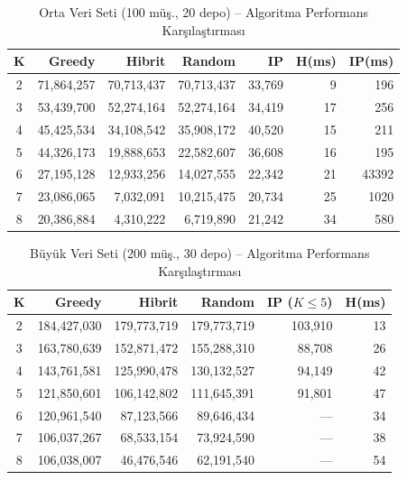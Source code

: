\documentclass[conference]{IEEEtran}
\begin{document}
\begin{table}[htbp]
\centering
\caption{Orta Veri Seti (100 m\"{u}\c{s}., 20 depo) --
Algoritma Performans Kar\c{s}{\i}la\c{s}t{\i}rmas{\i}}
\label{tab:orta}
\begin{tabular}{|c|r|r|r|r|r|r|}
\hline
\textbf{K} & \textbf{Greedy} & \textbf{Hibrit} & \textbf{Random}
           & \textbf{IP} & \textbf{H(ms)} & \textbf{IP(ms)} \\
\hline
2 & 71,864,257 & 70,713,437 & 70,713,437 &  33,769 &   9 &   196 \\
\hline
3 & 53,439,700 & 52,274,164 & 52,274,164 &  34,419 &  17 &   256 \\
\hline
4 & 45,425,534 & 34,108,542 & 35,908,172 &  40,520 &  15 &   211 \\
\hline
5 & 44,326,173 & 19,888,653 & 22,582,607 &  36,608 &  16 &   195 \\
\hline
6 & 27,195,128 & 12,933,256 & 14,027,555 &  22,342 &  21 & 43392 \\
\hline
7 & 23,086,065 &  7,032,091 & 10,215,475 &  20,734 &  25 &  1020 \\
\hline
8 & 20,386,884 &  4,310,222 &  6,719,890 &  21,242 &  34 &   580 \\
\hline
\end{tabular}
\end{table}

\begin{table}[htbp]
\centering
\caption{B\"{u}y\"{u}k Veri Seti (200 m\"{u}\c{s}., 30 depo) --
Algoritma Performans Kar\c{s}{\i}la\c{s}t{\i}rmas{\i}}
\label{tab:buyuk}
\begin{tabular}{|c|r|r|r|r|r|}
\hline
\textbf{K} & \textbf{Greedy} & \textbf{Hibrit} & \textbf{Random}
           & \textbf{IP ($K{\le}5$)} & \textbf{H(ms)} \\
\hline
2 & 184,427,030 & 179,773,719 & 179,773,719 & 103,910 &  13 \\
\hline
3 & 163,780,639 & 152,871,472 & 155,288,310 &  88,708 &  26 \\
\hline
4 & 143,761,581 & 125,990,478 & 130,132,527 &  94,149 &  42 \\
\hline
5 & 121,850,601 & 106,142,802 & 111,645,391 &  91,801 &  47 \\
\hline
6 & 120,961,540 &  87,123,566 &  89,646,434 & --- &  34 \\
\hline
7 & 106,037,267 &  68,533,154 &  73,924,590 & --- &  38 \\
\hline
8 & 106,038,007 &  46,476,546 &  62,191,540 & --- &  54 \\
\hline
\end{tabular}
\end{table}
\end{document}
